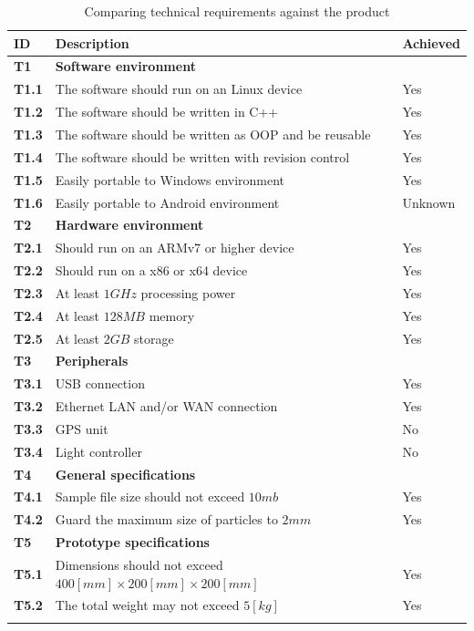 \documentclass[11pt,fleqn,,a4paper,twoside,openright]{book}
\begin{document}
\begin{longtable}{|p{1cm}| p{10cm} p{1.5cm}|}
	\hline
	\textbf{ID} & \textbf{Description} & \textbf{Achieved} \\
	\endhead
	\hline
	\textbf{T1}\label{T1} & \textbf{Software environment} &  \\
	\hline
	\textbf{T1.1}\label{T1.1} & The software should run on an Linux device & Yes \\
	\hline
	\textbf{T1.2}\label{T1.2} & The software should be written in C++ & Yes \\
	\hline
	\textbf{T1.3}\label{T1.3} & The software should be written as OOP and be reusable & Yes \\
	\hline
	\textbf{T1.4}\label{T1.4} & The software should be written with revision control & Yes \\
	\hline
	\textbf{T1.5}\label{T1.5} & Easily portable to Windows environment & Yes \\
	\hline
	\textbf{T1.6}\label{T1.6} & Easily portable to Android environment & Unknown \\
	\hline
	\textbf{T2}\label{T2} & \textbf{Hardware environment} &  \\
	\hline
	\textbf{T2.1}\label{T2.1} & Should run on an ARMv7 or higher device &  Yes \\
	\hline
	\textbf{T2.2}\label{T2.2} & Should run on a x86 or x64 device & Yes \\
	\hline
	\textbf{T2.3}\label{T2.3} & At least $1 GHz$ processing power & Yes \\
	\hline
	\textbf{T2.4}\label{T2.4} & At least $128 MB$ memory & Yes \\
	\hline
	\textbf{T2.5}\label{T2.5} & At least $2 GB$ storage & Yes \\
	\hline
	\textbf{T3}\label{T3} & \textbf{Peripherals}  &  \\
	\hline
	\textbf{T3.1}\label{T3.1} & USB connection  & Yes \\
	\hline
	\textbf{T3.2}\label{T3.2} & Ethernet LAN and/or WAN connection  & Yes \\
	\hline
	\textbf{T3.3}\label{T3.3} & GPS unit & No  \\
	\hline
	\textbf{T3.4}\label{T3.4} & Light controller & No \\
	\hline
	\textbf{T4}\label{T4} & \textbf{General specifications} &  \\
	\hline
	\textbf{T4.1}\label{T4.1} & Sample file size should not exceed $ 10 mb $ & Yes \\
	\hline
	\textbf{T4.2}\label{T4.2} & Guard the maximum size of particles to $ 2 mm $ & Yes \\
	\hline
	\textbf{T5}\label{T5} & \textbf{Prototype specifications} &  \\
	\hline
	\textbf{T5.1}\label{T5.1} & Dimensions should not exceed $ 400[mm] \times 200[mm] \times 200[mm] $ & Yes \\
	\hline
	\textbf{T5.2}\label{T5.2} & The total weight may not exceed $ 5[kg] $ & Yes \\
	\hline
	\caption{Comparing technical requirements against the product}\label{tab:TechReqComp}
\end{longtable}
\end{document}
